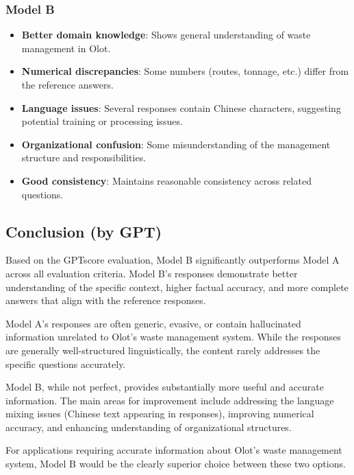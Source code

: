 \subsubsection{Model B}
\begin{itemize}
    \item \textbf{Better domain knowledge}: Shows general understanding of waste management in Olot.
    \item \textbf{Numerical discrepancies}: Some numbers (routes, tonnage, etc.) differ from the reference answers.
    \item \textbf{Language issues}: Several responses contain Chinese characters, suggesting potential training or processing issues.
    \item \textbf{Organizational confusion}: Some misunderstanding of the management structure and responsibilities.
    \item \textbf{Good consistency}: Maintains reasonable consistency across related questions.
\end{itemize}


\subsection{Conclusion (by GPT)}

Based on the GPTscore evaluation, Model B significantly outperforms Model A across all evaluation criteria. Model B's responses demonstrate better understanding of the specific context, higher factual accuracy, and more complete answers that align with the reference responses.

Model A's responses are often generic, evasive, or contain hallucinated information unrelated to Olot's waste management system. While the responses are generally well-structured linguistically, the content rarely addresses the specific questions accurately.

Model B, while not perfect, provides substantially more useful and accurate information. The main areas for improvement include addressing the language mixing issues (Chinese text appearing in responses), improving numerical accuracy, and enhancing understanding of organizational structures.

For applications requiring accurate information about Olot's waste management system, Model B would be the clearly superior choice between these two options.
